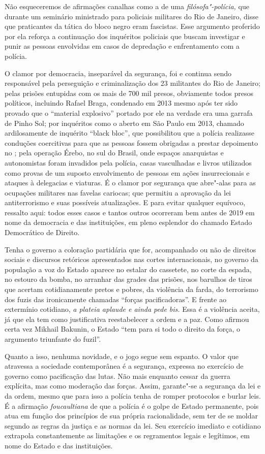 Não esqueceremos de afirmações canalhas como a de uma
\emph{filósofa"-polícia,} que durante um seminário ministrado para
policiais militares do Rio de Janeiro, disse que praticantes da tática
do bloco negro eram fascistas. Esse argumento proferido por ela reforça
a continuação dos inquéritos policiais que buscam investigar e punir as
pessoas envolvidas em casos de depredação e enfrentamento com a polícia.

O clamor por democracia, inseparável da segurança, foi e continua sendo
responsável pela perseguição e criminalização dos 23 militantes do Rio
de Janeiro; pelas prisões entupidas com os mais de 700 mil presos,
obviamente todos presos políticos, incluindo Rafael Braga, condenado em
2013 mesmo após ter sido provado que o ``material explosivo'' portado
por ele na verdade era uma garrafa de Pinho Sol; por inquéritos como o
aberto em São Paulo em 2013, chamado ardilosamente de inquérito ``black
bloc'', que possibilitou que a polícia realizasse conduções coercitivas
para que as pessoas fossem obrigadas a prestar depoimento no ; pela
operação Érebo, no sul do Brasil, onde espaços anarquistas e
autonomistas foram invadidos pela polícia, casas vasculhadas e livros
utilizados como provas de um suposto envolvimento de pessoas em ações
insurrecionais e ataques à delegacias e viaturas. É o clamor por
segurança que abre"-alas para as ocupações militares nas favelas
cariocas; que permitiu a aprovação da lei antiterrorismo e suas
possíveis atualizações. E para evitar qualquer equívoco, ressalto aqui:
todos esses casos e tantos outros ocorreram bem antes de 2019 em nome da
democracia e das instituições, em pleno esplendor do chamado Estado
Democrático de Direito.

Tenha o governo a coloração partidária que for, acompanhado ou não de
direitos sociais e discursos retóricos apresentados nas cortes
internacionais, no governo da população a voz do Estado aparece no
estalar do cassetete, no corte da espada, no estouro da bomba, no
arranhar das grades das prisões, nos barulhos de tiros que acertam
cotidianamente pretos e pobres, da violência da farda, do terrorismo dos
fuzis das ironicamente chamadas ``forças pacificadoras''. E frente ao
extermínio cotidiano, \emph{a plateia aplaude e ainda pede bis.} Essa é
a violência aceita, já que ela tem como justificativa reestabelecer a
ordem e a paz. Como afirmou certa vez Mikhail Bakunin, o Estado ``tem
para si todo o direito da força, o argumento triunfante do fuzil''.

Quanto a isso, nenhuma novidade, e o jogo segue sem espanto. O valor que
atravessa a sociedade contemporânea é a segurança, expressa no exercício
de governo como pacificação das lutas. Não mais enquanto cessar da
guerra explícita, mas como moderação das forças. Assim, garante"-se a
segurança da lei e da ordem, mesmo que para isso a polícia tenha de
romper protocolos e burlar leis. É a afirmação \emph{foucaultiana} de
que a polícia é o golpe de Estado permanente, pois atua em função dos
princípios de sua própria racionalidade, sem ter de se moldar segundo as
regras da justiça e as normas da lei. Seu exercício imediato e cotidiano
extrapola constantemente as limitações e os regramentos legais e
legítimos, em nome do Estado e das instituições.

